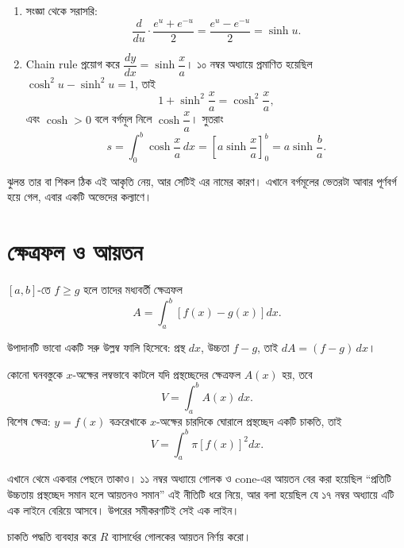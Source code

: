 \documentclass[11pt]{article}
\begin{document}
\begin{sol}
\begin{enumerate}
  \item সংজ্ঞা থেকে সরাসরি:
        \[
          \frac{d}{du}\cdot\frac{e^{u}+e^{-u}}{2}
          = \frac{e^{u}-e^{-u}}{2} = \sinh u .
        \]
  \item Chain rule প্রয়োগ করে $\dfrac{dy}{dx} = \sinh\dfrac{x}{a}$। ১০ নম্বর
        অধ্যায়ে প্রমাণিত হয়েছিল $\cosh^{2}u - \sinh^{2}u = 1$, তাই
        \[
          1 + \sinh^{2}\frac{x}{a} = \cosh^{2}\frac{x}{a} ,
        \]
        এবং $\cosh > 0$ বলে বর্গমূল নিলে $\cosh\dfrac{x}{a}$। সুতরাং
        \[
          s = \int_{0}^{b}\cosh\frac{x}{a}\,dx
            = \left[ a\sinh\frac{x}{a} \right]_{0}^{b}
            = a\sinh\frac{b}{a} .
        \]
\end{enumerate}
ঝুলন্ত তার বা শিকল ঠিক এই আকৃতি নেয়, আর সেটিই এর নামের কারণ। এখানে বর্গমূলের
ভেতরটা আবার পূর্ণবর্গ হয়ে গেল, এবার একটি অভেদের কল্যাণে।
\end{sol}

\section{ক্ষেত্রফল ও আয়তন}

\begin{idea}
$[a,b]$-তে $f \geq g$ হলে তাদের মধ্যবর্তী ক্ষেত্রফল
\[
  A = \int_{a}^{b}\left[ f(x) - g(x) \right]dx .
\]
\end{idea}

উপাদানটি ভাবো একটি সরু উল্লম্ব ফালি হিসেবে: প্রস্থ $dx$, উচ্চতা $f-g$, তাই
$dA = (f-g)\,dx$।

\begin{idea}
কোনো ঘনবস্তুকে $x$-অক্ষের লম্বভাবে কাটলে যদি প্রস্থচ্ছেদের ক্ষেত্রফল $A(x)$
হয়, তবে
\[
  V = \int_{a}^{b}A(x)\,dx .
\]
বিশেষ ক্ষেত্র: $y = f(x)$ বক্ররেখাকে $x$-অক্ষের চারদিকে ঘোরালে প্রস্থচ্ছেদ
একটি চাকতি, তাই
\[
  V = \int_{a}^{b}\pi\left[ f(x) \right]^{2}dx .
\]
\end{idea}

এখানে থেমে একবার পেছনে তাকাও। ১১ নম্বর অধ্যায়ে গোলক ও cone-এর আয়তন বের
করা হয়েছিল ``প্রতিটি উচ্চতায় প্রস্থচ্ছেদ সমান হলে আয়তনও সমান'' এই নীতিটি
ধরে নিয়ে, আর বলা হয়েছিল যে ১৭ নম্বর অধ্যায়ে এটি এক লাইনে বেরিয়ে আসবে।
উপরের সমীকরণটিই সেই এক লাইন।

\begin{example}
চাকতি পদ্ধতি ব্যবহার করে $R$ ব্যাসার্ধের গোলকের আয়তন নির্ণয় করো।
\end{example}
\end{document}

